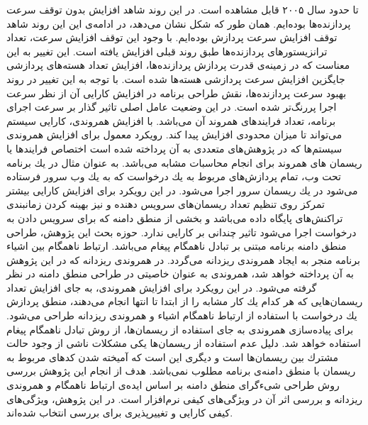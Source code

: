 تا حدود سال ۲۰۰۵ قابل مشاهده است. در این روند شاهد افزایش بدون توقف سرعت پردازنده‌ها بوده‌ایم. همان طور که شکل نشان می‌دهد، در ادامه‌ی این این روند شاهد توقف افزایش سرعت پردازش بوده‌ایم. با وجود این توقف افزایش سرعت، تعداد ترانزیستور‌های پردازنده‌ها طبق روند قبلی افزایش یافته است. این تغییر به این معناست که در زمینه‌ی قدرت پردازش پردازنده‌ها، افزایش تعداد هسته‌های پردازشی جایگزین افزایش سرعت پردازشی هسته‌ها شده است. با توجه به این تغییر در روند بهبود سرعت پردازنده‌ها، نقش طراحی برنامه در افزایش كارایی آن از نظر سرعت اجرا پررنگ‌تر شده است. در این وضعیت عامل اصلی تاثیر گذار بر سرعت اجرای برنامه، تعداد فرایندهای همروند آن می‌باشد. با افزایش همروندی، كارایی سیستم می‌تواند تا میزان محدودی افزایش پیدا کند. رویكرد معمول برای افزایش همروندی سیستم‌ها كه در پژوهش‌های متعددی به آن پرداخته شده است اختصاص فرایندها یا ریسمان های همروند برای انجام محاسبات مشابه می‌باشد. به عنوان مثال در یك برنامه تحت وب، تمام پردازش‌های مربوط به یك درخواست كه به یك وب سرور فرستاده می‌شود در یك ریسمان سرور اجرا می‌شود. در این رویكرد برای افزایش كارایی بیشتر تمركز روی تنظیم تعداد ریسمان‌های سرویس دهنده و نیز بهینه كردن زمانبندی تراكنش‌های پایگاه داده می‌باشد و بخشی از منطق دامنه كه برای سرویس دادن به درخواست اجرا می‌شود تاثیر چندانی بر كارایی ندارد. حوزه بحث این پژوهش، طراحی منطق دامنه برنامه مبتنی بر تبادل ناهمگام پیغام می‌باشد. ارتباط ناهمگام بین اشیاء برنامه منجر به ایجاد همروندی ریزدانه می‌گردد. در همروندی ریزدانه كه در این پژوهش به آن پرداخته خواهد شد، همروندی به عنوان خاصیتی در طراحی منطق دامنه در نظر گرفته می‌شود. در این رویكرد برای افزایش همروندی، به جای افزایش تعداد ریسمان‌هایی كه هر كدام یك كار مشابه را از ابتدا تا انتها انجام می‌دهند، منطق پردازش یك درخواست با استفاده از ارتباط ناهمگام اشیاء و همروندی ریزدانه طراحی می‌شود. برای پیاده‌سازی همروندی به جای استفاده از ریسمان‌ها، از روش تبادل ناهمگام پیغام استفاده خواهد شد. دلیل عدم استفاده از ریسمان‌ها یكی مشكلات ناشی از وجود حالت مشترك 
بین ریسمان‌ها است و دیگری این است كه آمیخته شدن كدهای مربوط به ریسمان با منطق دامنه‌ی برنامه مطلوب نمی‌باشد. هدف از انجام این پژوهش بررسی روش طراحی شیءگرای منطق دامنه بر اساس ایده‌ی ارتباط ناهمگام و همروندی ریزدانه و بررسی اثر آن در ویژگی‌های كیفی نرم‌افزار است. در این پژوهش، ویژگی‌های كیفی كارایی
و تغییرپذیری
برای بررسی انتخاب شده‌اند.
